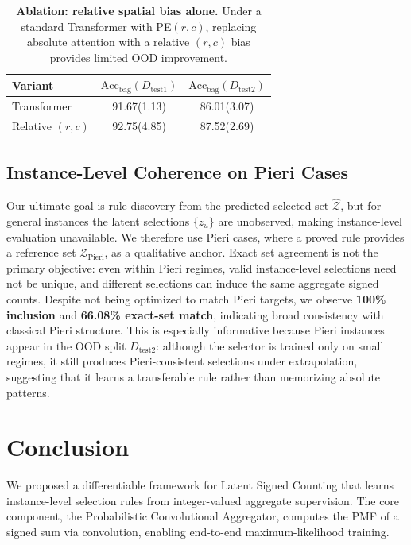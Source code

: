 \documentclass{article}
\theoremstyle{plain}
\theoremstyle{definition}
\theoremstyle{remark}
\begin{document}
\begin{table}[t]
	\centering
\caption{\textbf{Ablation: relative spatial bias alone.}
Under a standard Transformer with PE$(r,c)$, replacing absolute attention with a relative $(r,c)$ bias provides limited OOD improvement.}


	\label{tab:ablation_rel_rc}
	\begin{tabular}{lcc}
		\toprule
		\textbf{Variant} &
		$\mathrm{Acc}_{\text{bag}}(D_{\text{test1}})$ &
		$\mathrm{Acc}_{\text{bag}}(D_{\text{test2}})$ \\
		\midrule
		Transformer & 91.67(1.13) & 86.01(3.07) \\
		Relative $(r,c)$ & 92.75(4.85) & 87.52(2.69) \\
		\bottomrule
	\end{tabular}
\end{table}

\subsection{Instance-Level Coherence on Pieri Cases}
\label{sec:pieri_coherence}

Our ultimate goal is rule discovery from the predicted selected set $\hat{\mathcal Z}$, but for general instances the latent selections $\{z_u\}$ are unobserved, making instance-level evaluation unavailable. We therefore use Pieri cases, where a proved rule provides a reference set $\mathcal Z_{\text{Pieri}}$, as a qualitative anchor. Exact set agreement is not the primary objective: even within Pieri regimes, valid instance-level selections need not be unique, and different selections can induce the same aggregate signed counts. Despite not being optimized to match Pieri targets, we observe \textbf{100\% inclusion} and \textbf{66.08\% exact-set match}, indicating broad consistency with classical Pieri structure.
This is especially informative because Pieri instances appear in the OOD split $D_{\text{test2}}$: although the selector is trained only on small regimes, it still produces Pieri-consistent selections under extrapolation, suggesting that it learns a transferable rule rather than memorizing absolute patterns.



\section{Conclusion}
\label{sec:conclusion}

We proposed a differentiable framework for Latent Signed Counting that learns instance-level selection rules from integer-valued aggregate supervision. The core component, the Probabilistic Convolutional Aggregator, computes the PMF of a signed sum via convolution, enabling end-to-end maximum-likelihood training.
\end{document}
